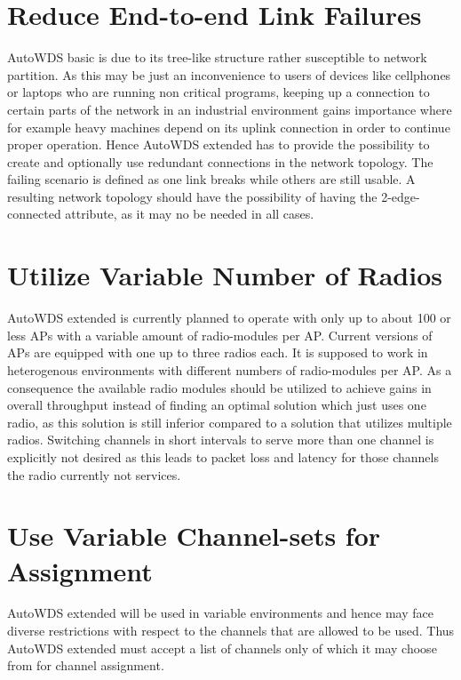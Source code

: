   \section{Reduce End-to-end Link Failures}
  \label{regendtoend}
  AutoWDS basic is due to its tree-like structure rather susceptible to network partition.
  As this may be just an inconvenience to users of devices like cellphones or laptops who are running non critical programs, 
  keeping up a connection to certain parts of the network in an industrial environment gains importance where for example heavy machines depend on its uplink connection in order 
  to continue proper operation. Hence AutoWDS extended has to provide the possibility to create and optionally use
  redundant connections in the network topology. The failing scenario is defined as one link breaks while others are still usable.
  A resulting network topology should have the possibility of having the 2-edge-connected attribute, as it may no be needed in all cases.
  
  \section{Utilize Variable Number of Radios}
  \label{utilvarnumradio}
  AutoWDS extended is currently planned to operate with only up to about 100 or less APs with a variable amount of radio-modules per \ac{AP}.
  Current versions of APs are equipped with one up to three radios each. It is supposed to work in heterogenous environments with 
  different numbers of radio-modules per \ac{AP}. As a consequence the available radio modules 
  should be utilized to achieve gains in overall throughput instead of finding an optimal solution which just uses one radio, as this solution is
  still inferior compared to a solution that utilizes multiple radios.
  Switching channels in short intervals to serve more than one channel is explicitly not desired as this leads to packet loss and latency for those channels the radio
  currently not services.
  
  \section{Use Variable Channel-sets for Assignment}
  AutoWDS extended will be used in variable environments and hence may face diverse restrictions with respect to the channels that are allowed to be used.
  Thus AutoWDS extended must accept a list of channels only of which it may choose from for channel assignment.
  
